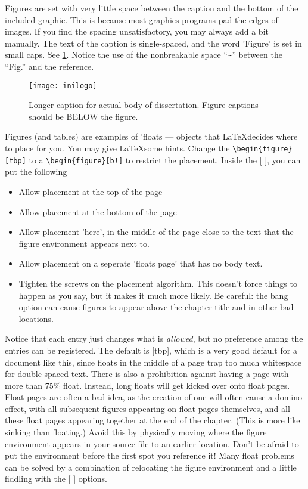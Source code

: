 Figures are set with very little space between the caption and the bottom of
the included graphic.  This is because most graphics programs pad the edges
of images.  If you find the spacing unsatisfactory, you may always add a bit
manually.  The text of the caption is single-spaced, and the word 'Figure'
is set in small caps.  See \ref{fig:example}.  Notice the use of the
nonbreakable space ``{\verb!~!}'' between the ``Fig.'' and the reference.
\begin{figure}[tbp]
\begin{center}
\texttt{[image: inilogo]}
\end{center}
\caption[Short caption for table of figures.]{Longer caption for actual body
of dissertation.  Figure captions should be BELOW the figure.}
\label{fig:example}
\end{figure}
Figures (and tables) are examples of 'floats --- objects that \LaTeX decides
where to place for you.  You may give \LaTeX some hints.  Change the 
{\verb"\begin{figure}[tbp]"} to a {\verb"\begin{figure}[b!]"} to restrict the
placement.  Inside the [ ], you can put the following
\begin{itemize}
\item[t] Allow placement at the top of the page
\item[b] Allow placement at the bottom of the page
\item[h] Allow placement 'here', in the middle of the page close to the text
that the figure environment appears next to.
\item[p] Allow placement on a seperate 'floats page' that has no body text.
\item[!] Tighten the screws on the placement algorithm.  This doesn't force
	things to happen as you say, but it makes it much more likely.  
	Be careful: the bang option can cause figures
   to appear above the chapter title and in other bad locations.
\end{itemize}
Notice that each entry just changes what is \emph{allowed}, 
but no preference among
the entries can be registered.  The default is [tbp], which is a very good
default for a document like this, since floats in the middle of a page trap
too much whitespace for double-spaced text. There is also a prohibition against
having a page with more than 75\% float.  Instead, long floats will
get kicked over onto float pages.  Float pages are often a bad idea, as the
creation of one will often cause a domino effect, with all subsequent
figures appearing on float pages themselves, and all these float pages
appearing together at the end of the chapter.  (This is more like sinking
than floating.)  Avoid this by physically moving where the figure environment
appears in your source file to an earlier location.  Don't be afraid to put the environment before
the first spot you reference it!  Many float problems can be solved by a
combination of relocating the figure environment and a little fiddling with the [ ] options.

